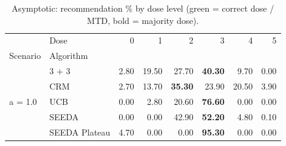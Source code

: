 \begin{table}[H]
\centering
\caption{Asymptotic: recommendation \% by dose level (green = correct dose / MTD, bold = majority dose).}
\label{tab:asym_rec_by_dose}
\begin{tabular}{llrrrrrr}
\toprule
 & Dose & 0 & 1 & 2 & 3 & 4 & 5 \\
Scenario & Algorithm &  &  &  &  &  &  \\
\midrule
\multirow[c]{5}{*}{a = 1.0} & 3 + 3 & 2.80 & 19.50 & {\cellcolor[HTML]{C8E6C9}} 27.70 & \bfseries 40.30 & 9.70 & 0.00 \\
 & CRM & 2.70 & 13.70 & {\cellcolor[HTML]{C8E6C9}} \bfseries 35.30 & 23.90 & 20.50 & 3.90 \\
 & UCB & 0.00 & 2.80 & {\cellcolor[HTML]{C8E6C9}} 20.60 & \bfseries 76.60 & 0.00 & 0.00 \\
 & SEEDA & 0.00 & 0.00 & {\cellcolor[HTML]{C8E6C9}} 42.90 & \bfseries 52.20 & 4.80 & 0.10 \\
 & SEEDA Plateau & 4.70 & 0.00 & {\cellcolor[HTML]{C8E6C9}} 0.00 & \bfseries 95.30 & 0.00 & 0.00 \\
\bottomrule
\end{tabular}
\end{table}
